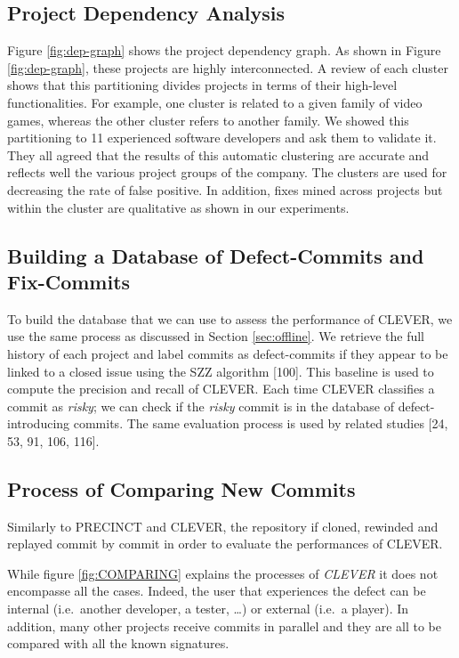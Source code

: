 \documentclass[12pt]{report}
\begin{document}
\subsection{Project Dependency Analysis}\label{sec:dependencies}

Figure \ref{fig:dep-graph} shows the project dependency graph. As shown
in Figure \ref{fig:dep-graph}, these projects are highly interconnected.
A review of each cluster shows that this partitioning divides projects
in terms of their high-level functionalities. For example, one cluster
is related to a given family of video games, whereas the other cluster
refers to another family. We showed this partitioning to 11 experienced
software developers and ask them to validate it. They all agreed that
the results of this automatic clustering are accurate and reflects well
the various project groups of the company. The clusters are used for
decreasing the rate of false positive. In addition, fixes mined across
projects but within the cluster are qualitative as shown in our
experiments.

\subsection{Building a Database of Defect-Commits and
Fix-Commits}\label{sub:golden}

To build the database that we can use to assess the performance of
CLEVER, we use the same process as discussed in Section
\ref{sec:offline}. We retrieve the full history of each project and
label commits as defect-commits if they appear to be linked to a closed
issue using the SZZ algorithm {[}100{]}. This baseline is used to
compute the precision and recall of CLEVER. Each time CLEVER classifies
a commit as \emph{risky}; we can check if the \emph{risky} commit is in
the database of defect-introducing commits. The same evaluation process
is used by related studies {[}24, 53, 91, 106, 116{]}.

\subsection{Process of Comparing New Commits}\label{sec:newcommits}



Similarly to PRECINCT and CLEVER, the repository if cloned, rewinded and
replayed commit by commit in order to evaluate the performances of
CLEVER.

While figure \ref{fig:COMPARING} explains the processes of \emph{CLEVER}
it does not encompasse all the cases. Indeed, the user that experiences
the defect can be internal (i.e.~another developer, a tester, \ldots{})
or external (i.e.~a player). In addition, many other projects receive
commits in parallel and they are all to be compared with all the known
signatures.
\end{document}
